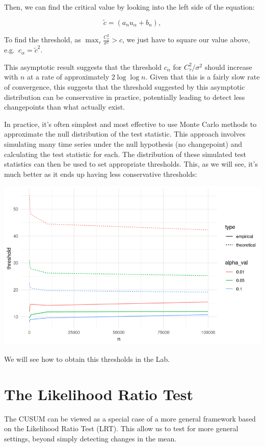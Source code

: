 \documentclass[
  letterpaper,
  DIV=11,
  numbers=noendperiod]{scrreprt}
\begin{document}
Then, we can find the critical value by looking into the left side of
the equation:

\[
\tilde{c} = (a_n u_\alpha + b_n),
\]

To find the threshold, as
\(\max_\tau \frac{C_{\tau}^2 }{\sigma^2} > c\), we just have to square
our value above, e.g.~\(c_\alpha = \tilde{c}^2\).

This asymptotic result suggests that the threshold \(c_\alpha\) for
\(C_τ^2/σ^2\) should increase with \(n\) at a rate of approximately
\(2 \log \log n\). Given that this is a fairly slow rate of convergence,
this suggests that the threshold suggested by this asymptotic
distribution can be conservative in practice, potentially leading to
detect less changepoints than what actually exist.

In practice, it's often simplest and most effective to use Monte Carlo
methods to approximate the null distribution of the test statistic. This
approach involves simulating many time series under the null hypothesis
(no changepoint) and calculating the test statistic for each. The
distribution of these simulated test statistics can then be used to set
appropriate thresholds. This, as we will see, it's much better as it
ends up having less conservative thresholds:

\includegraphics{source_imgs/empirical_thres_comparison.png}

We will see how to obtain this thresholds in the Lab.

\section{The Likelihood Ratio Test}\label{the-likelihood-ratio-test}

The CUSUM can be viewed as a special case of a more general framework
based on the Likelihood Ratio Test (LRT). This allow us to test for more
general settings, beyond simply detecting changes in the mean.
\end{document}
